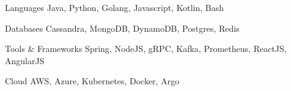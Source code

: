 


\begin{cvskills}


\cvskill
{Languages} %
{Java, Python, Golang, Javascript, Kotlin, Bash} %


\cvskill
{Databases} %
{Cassandra, MongoDB, DynamoDB, Postgres, Redis} %


\cvskill
{Tools \& Frameworks} %
{Spring, NodeJS, gRPC, Kafka, Prometheus, ReactJS, AngularJS} %


\cvskill
{Cloud} %
{AWS, Azure, Kubernetes, Docker, Argo} %


\end{cvskills}